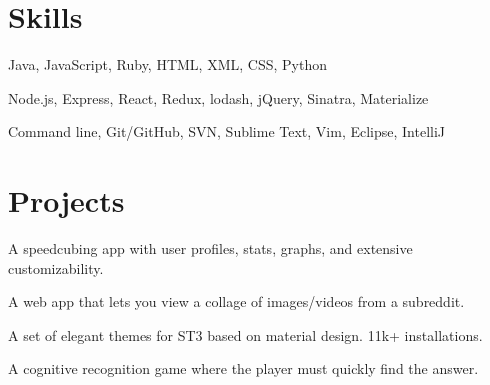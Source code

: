 \documentclass[]{deedy-resume-openfont}
\begin{document}
\begin{minipage}[t]{.3\textwidth}
\section{Skills}
Java, JavaScript, Ruby, HTML, XML, CSS, Python

\vspace{2mm}

Node.js, Express, React, Redux, lodash, jQuery, Sinatra, Materialize

\vspace{2mm}

Command line, Git/GitHub, SVN, Sublime Text, Vim, Eclipse, IntelliJ

\end{minipage}
\hfill
\begin{minipage}[t]{.65\textwidth}
\section{Projects}
A speedcubing app with user profiles, stats, graphs, and extensive customizability.

\vspace{2mm}

A web app that lets you view a collage of images/videos from a subreddit.

\vspace{2mm}

A set of elegant themes for ST3 based on material design. 11k+ installations.

\vspace{2mm}

A cognitive recognition game where the player must quickly find the answer.

\end{minipage}
\end{document}
